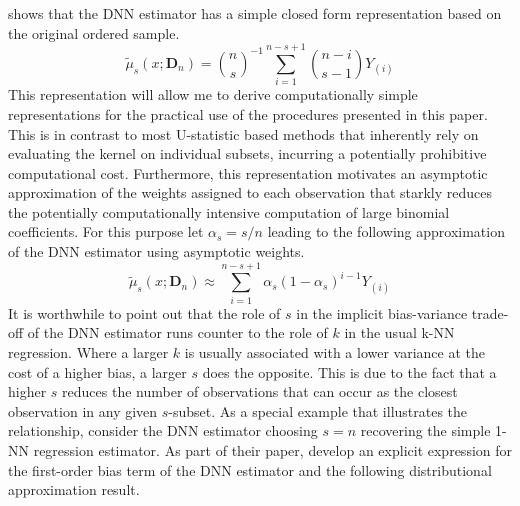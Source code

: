 \citet{steele_exact_2009} shows that the DNN estimator has a simple closed form representation based on the original ordered sample.
\begin{equation}\label{eq:DNN_closed_form}
	\tilde{\mu}_{s}(x; \mathbf{D}_n)
	= \binom{n}{s}^{-1} \sum_{i = 1}^{n - s + 1}\binom{n - i}{s - 1}Y_{(i)}
\end{equation}
This representation will allow me to derive computationally simple representations for the practical use of the procedures presented in this paper.
This is in contrast to most U-statistic based methods that inherently rely on evaluating the kernel on individual subsets, incurring a potentially prohibitive computational cost.
Furthermore, this representation motivates an asymptotic approximation of the weights assigned to each observation that starkly reduces the potentially computationally intensive computation of large binomial coefficients.
For this purpose let $\alpha_{s} = s/n$ leading to the following approximation of the DNN estimator using asymptotic weights.
\begin{equation}\label{eq:DNN_approx_closed_form}
	\tilde{\mu}_{s}(x; \mathbf{D}_n)
	\approx  \sum_{i = 1}^{n - s + 1} \alpha_{s} \left(1 - \alpha_{s}\right)^{i - 1} Y_{(i)}
\end{equation}
It is worthwhile to point out that the role of $s$ in the implicit bias-variance trade-off of the DNN estimator runs counter to the role of $k$ in the usual k-NN regression.
Where a larger $k$ is usually associated with a lower variance at the cost of a higher bias, a larger $s$ does the opposite.
This is due to the fact that a higher $s$ reduces the number of observations that can occur as the closest observation in any given $s$-subset.
As a special example that illustrates the relationship, consider the DNN estimator choosing $s = n$ recovering the simple 1-NN regression estimator.
As part of their paper, \citet{demirkaya_optimal_2024} develop an explicit expression for the first-order bias term of the DNN estimator and the following distributional approximation result.
